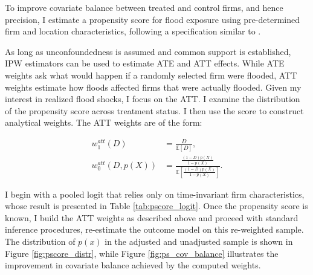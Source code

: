 To improve covariate balance between treated and control firms, and hence precision, I estimate a propensity score for flood exposure using pre-determined firm and location characteristics, following a specification similar to \cite{fatica2024floods}.

As long as unconfoundedness is assumed and common support is established, IPW estimators can be used to estimate ATE and ATT effects. While ATE weights ask what would happen if a randomly selected firm were flooded, ATT weights estimate how floods affected firms that were actually flooded. Given my interest in realized flood shocks, I focus on the ATT. I examine the distribution of the propensity score across treatment status. I then use the score to construct analytical weights. The ATT weights are of the form:

\noindent{}
\begin{align*} w_1^{att}(D) &= \frac{D}{\mathbb{E}[D]}, \\ w_0^{att}(D, p(X)) &= \frac{\frac{(1 - D)p(X)}{1 - p(X)}}{\mathbb{E}\left[ \frac{(1 - D)p(X)}{1 - p(X)} \right]}. \end{align*}

I begin with a pooled logit that relies only on time-invariant firm characteristics, whose result is presented in Table \ref{tab:pscore_logit}. Once the propensity score is known, I build the ATT weights as described above and proceed with standard inference procedures, re-estimate the outcome model on this re-weighted sample. The distribution of $p(x)$ in the adjusted and unadjusted sample is shown in Figure \ref{fig:pscore_distr}, while Figure \ref{fig:ps_cov_balance} illustrates the improvement in covariate balance achieved by the computed weights.

\vspace{1cm}




